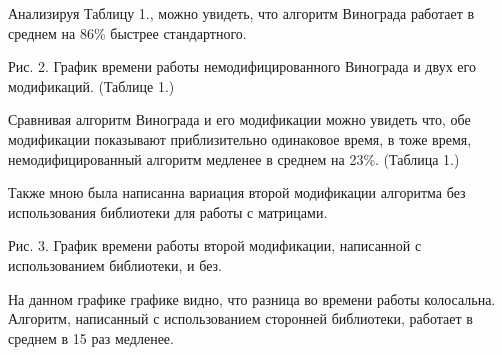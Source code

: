 \documentclass[12pt]{report}
\begin{document}
Анализируя Таблицу 1., можно увидеть, что алгоритм Винограда работает в среднем на 86\% быстрее стандартного.

\begin{center}

Рис. 2. График времени работы немодифицированного Винограда и двух его модификаций. (Таблице 1.)
\end{center}

Сравнивая алгоритм Винограда и его модификации можно увидеть что, обе модификации показывают приблизительно одинаковое время, в тоже время,
немодифицированный алгоритм медленее в среднем на 23\%. (Таблица 1.)

Также мною была написанна вариация второй модификации алгоритма без использования библиотеки для работы с матрицами.

\begin{center}

Рис. 3. График времени работы второй модификации, написанной с использованием библиотеки, и без.
\end{center}

На данном графике графике видно, что разница во времени работы колосальна.
Алгоритм, написанный с использованием сторонней библиотеки, работает в среднем в 15 раз медленее.
\end{document}
